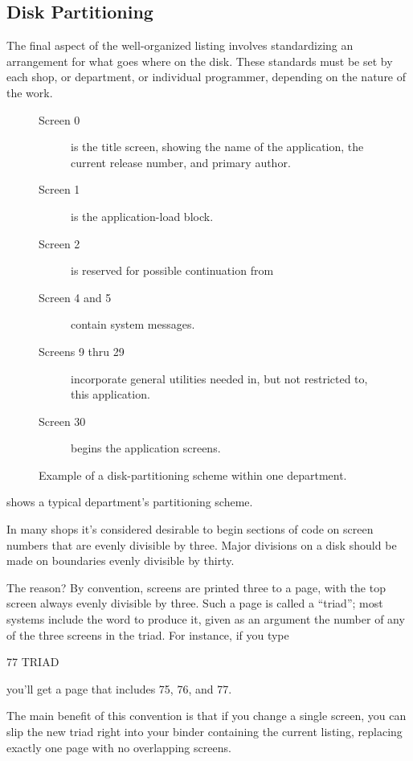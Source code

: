\subsection{Disk Partitioning}
The final aspect of the well-organized listing involves standardizing an
arrangement for what goes where on the disk.  These standards must be
set by each shop, or department, or individual programmer, depending on
the nature of the work.
\begin{figure*}
\caption{Example of a disk-partitioning scheme within one department.}

\begin{description}
\item[Screen 0] is the title screen, showing the name of the
    application, the current release number, and primary
    author.
\item[Screen 1] is the application-load block.
\item[Screen 2] is reserved for possible continuation from
\item[Screen 4 and 5] contain system messages.
\item[Screens 9 thru 29] incorporate general utilities needed
    in, but not restricted to, this application.
\item[Screen 30] begins the application screens.
\end{description}
\end{figure*}

 shows a typical department's partitioning scheme.

In many \Forth{} shops it's considered desirable to begin sections of
code on screen numbers that are evenly divisible by three.  Major divisions
on a disk should be made on boundaries evenly divisible by thirty.

The reason? By convention, \Forth{} screens are printed three to a
page, with the top screen always evenly divisible by three.  Such a page is
called a ``triad''; most \Forth{} systems include the word  to
produce it, given as an argument the number of any of the three screens
in the triad.  For instance, if you type
\begin{Code}
77 TRIAD
\end{Code}
you'll get a page that includes 75, 76, and 77.

The main benefit of this convention is that if you change a single
screen, you can slip the new triad right into your binder containing the
current listing, replacing exactly one page with no overlapping screens.

